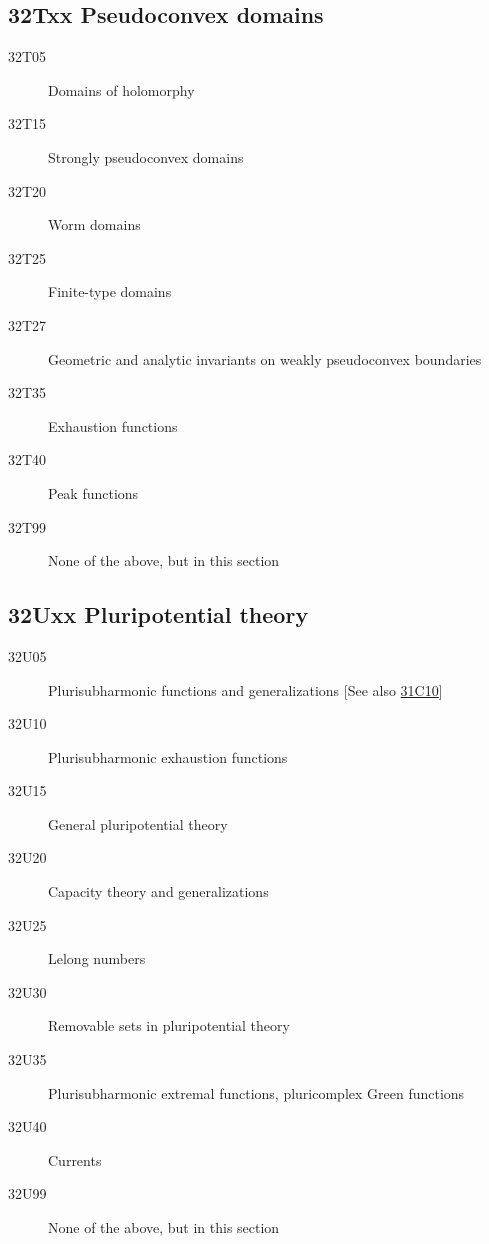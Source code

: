 \subsection*{32Txx  Pseudoconvex domains }\label{32Txx}
\begin{description}  
\item [32T05]\label{32T05} Domains of holomorphy
\item [32T15]\label{32T15} Strongly pseudoconvex domains
\item [32T20]\label{32T20} Worm domains
\item [32T25]\label{32T25} Finite-type domains
\item [32T27]\label{32T27} Geometric and analytic invariants on weakly pseudoconvex boundaries
\item [32T35]\label{32T35} Exhaustion functions
\item [32T40]\label{32T40} Peak functions
\item [32T99]\label{32T99} None of the above, but in this section
\end{description}
\subsection*{32Uxx  Pluripotential theory }\label{32Uxx}
\begin{description}  
\item [32U05]\label{32U05} Plurisubharmonic functions and generalizations [See also \hyperref[31C10]{31C10}]
\item [32U10]\label{32U10} Plurisubharmonic exhaustion functions
\item [32U15]\label{32U15} General pluripotential theory
\item [32U20]\label{32U20} Capacity theory and generalizations
\item [32U25]\label{32U25} Lelong numbers
\item [32U30]\label{32U30} Removable sets in pluripotential theory
\item [32U35]\label{32U35} Plurisubharmonic extremal functions, pluricomplex Green functions
\item [32U40]\label{32U40} Currents
\item [32U99]\label{32U99} None of the above, but in this section
\end{description}
